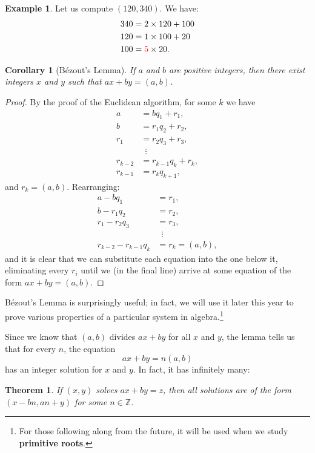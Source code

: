 \documentclass[a4paper,leqno]{article}
\numberwithin{equation}{section}
\newtheorem{thm}[equation]{Theorem}
\newtheorem{cor}[equation]{Corollary}
\theoremstyle{definition}
\newtheorem{ex}[equation]{Example}
\theoremstyle{remark}
\newcommand{\df}[1]{\textbf{#1}}
\begin{document}
\begin{ex}
  Let us compute $ (120, 340) $. We have:
  \begin{align*}
    340 &= 2 \times 120 + 100\\
    120 &= 1 \times 100 + 20\\
    100 &= {\color{red}5} \times 20.
  \end{align*}
\end{ex}

\begin{cor}[B\'ezout's Lemma]
  If $ a $ and $ b $ are positive integers, then there exist integers $ x $ and $ y $ such that $ ax + by = (a,b) $.
\end{cor}
\begin{proof}
  By the proof of the Euclidean algorithm, for some $ k $ we have
  \begin{align*}
    a &= bq_1 + r_1,\\
    b &= r_1q_2 + r_2,\\
    r_1 &= r_2 q_3 + r_3,\\\
    &\enspace \vdots\\
    r_{k - 2} &= r_{k - 1} q_k + r_k,\\
    r_{k - 1} &= r_k q_{k + 1},
  \end{align*}
  and $ r_k = (a,b) $. Rearranging:
  \begin{align*}
    a - bq_1 &= r_1,\\
    b - r_1q_2 &= r_2,\\
    r_1 - r_2 q_3 &= r_3,\\\
    &\enspace \vdots\\
    r_{k - 2} - r_{k - 1} q_k &= r_k = (a,b),
  \end{align*}
  and it is clear that we can substitute each equation into the one below it, eliminating every $ r_i $ until
  we (in the final line) arrive at some equation of the form $ ax + by = (a,b) $.
\end{proof}

B\'ezout's Lemma is surprisingly useful; in fact, we will use it later this year to prove various properties of a particular system
in algebra.\footnote{For those following along from the future, it will be used when we study \df{primitive roots}.}

Since we know that $ (a,b) $ divides $ ax + by $ for all $ x $ and $ y $, the lemma tells us that for every $ n $, the equation
\begin{equation}
  ax + by = n(a,b)
\end{equation}
has an integer solution for $ x $ and $ y $. In fact, it has infinitely many:
\begin{thm}
  If $ (x,y) $ solves $ ax + by = z $, then all solutions are of the form $ (x - bn, an + y) $ for some $ n \in \mathbb{Z} $.
\end{thm}
\end{document}
